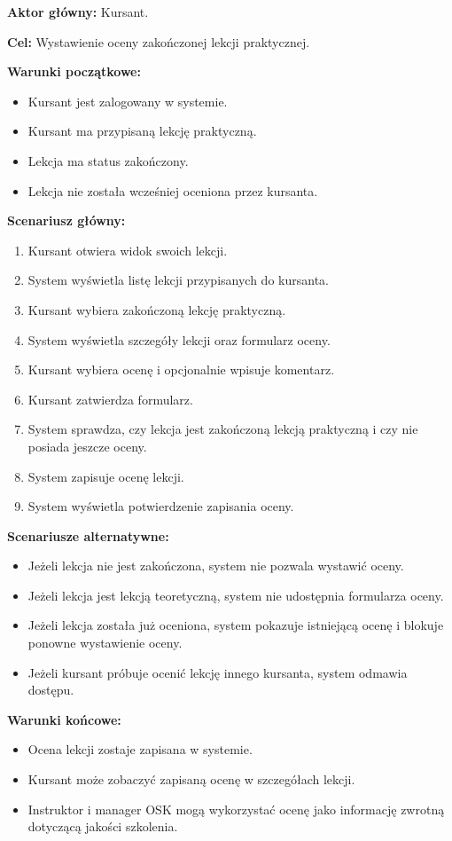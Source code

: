 \noindent\textbf{Aktor główny:} Kursant.

\noindent\textbf{Cel:} Wystawienie oceny zakończonej lekcji praktycznej.

\noindent\textbf{Warunki początkowe:}
\begin{itemize}
    \item Kursant jest zalogowany w systemie.
    \item Kursant ma przypisaną lekcję praktyczną.
    \item Lekcja ma status zakończony.
    \item Lekcja nie została wcześniej oceniona przez kursanta.
\end{itemize}

\noindent\textbf{Scenariusz główny:}
\begin{enumerate}
    \item Kursant otwiera widok swoich lekcji.
    \item System wyświetla listę lekcji przypisanych do kursanta.
    \item Kursant wybiera zakończoną lekcję praktyczną.
    \item System wyświetla szczegóły lekcji oraz formularz oceny.
    \item Kursant wybiera ocenę i opcjonalnie wpisuje komentarz.
    \item Kursant zatwierdza formularz.
    \item System sprawdza, czy lekcja jest zakończoną lekcją praktyczną i czy nie posiada jeszcze oceny.
    \item System zapisuje ocenę lekcji.
    \item System wyświetla potwierdzenie zapisania oceny.
\end{enumerate}

\noindent\textbf{Scenariusze alternatywne:}
\begin{itemize}
    \item Jeżeli lekcja nie jest zakończona, system nie pozwala wystawić oceny.
    \item Jeżeli lekcja jest lekcją teoretyczną, system nie udostępnia formularza oceny.
    \item Jeżeli lekcja została już oceniona, system pokazuje istniejącą ocenę i blokuje ponowne wystawienie oceny.
    \item Jeżeli kursant próbuje ocenić lekcję innego kursanta, system odmawia dostępu.
\end{itemize}

\noindent\textbf{Warunki końcowe:}
\begin{itemize}
    \item Ocena lekcji zostaje zapisana w systemie.
    \item Kursant może zobaczyć zapisaną ocenę w szczegółach lekcji.
    \item Instruktor i manager OSK mogą wykorzystać ocenę jako informację zwrotną dotyczącą jakości szkolenia.
\end{itemize}

